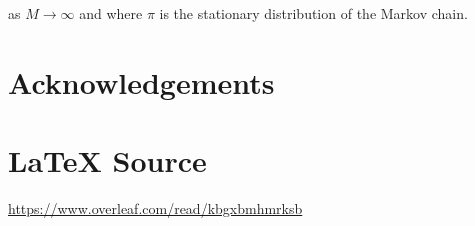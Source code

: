 \documentclass[11pt, oneside]{article}					%
\begin{document}
\bigskip
\noindent
as $M \rightarrow \infty$ and where $\pi$ is the stationary
distribution of the Markov chain.
%
%
%
\section*{Acknowledgements}
%
%
\section*{\LaTeX \hspace{0.10 mm} Source}
\url{https://www.overleaf.com/read/kbgxbmhmrksb}
%
%
%


%
%
\end{document}
